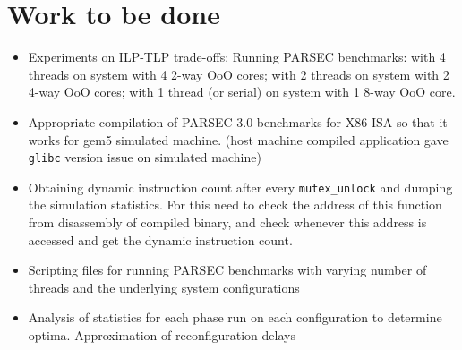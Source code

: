 \documentclass[a4paper,12pt, final]{report}
\begin{document}
\section{Work to be done}
\begin{itemize}
    \item Experiments on ILP-TLP trade-offs: Running PARSEC benchmarks: with 4 threads on system with 4 2-way OoO cores; with 2 threads on system with 2 4-way OoO cores; with 1 thread (or serial) on system with 1 8-way OoO core. 
    \item Appropriate compilation of PARSEC 3.0 benchmarks for X86 ISA so that it works for gem5 simulated machine. (host machine compiled application gave \texttt{glibc} version issue on simulated machine)
    \item Obtaining dynamic instruction count after every \texttt{mutex\_unlock} and dumping the simulation statistics. For this need to check the address of this function from disassembly of compiled binary, and check whenever this address is accessed and get the dynamic instruction count.
    \item Scripting files for running PARSEC benchmarks with varying number of threads and the underlying system configurations 
    \item Analysis of statistics for each phase run on each configuration to determine optima. Approximation of reconfiguration delays
\end{itemize}

{}
\end{document}

